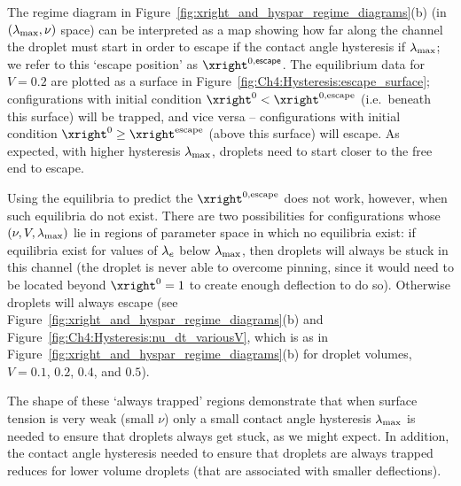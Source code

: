 The regime diagram in Figure~\ref{fig:xright_and_hyspar_regime_diagrams}(b)  (in $(\lambda_{\text{max}}, \nu)$ space) can be interpreted as a map showing how far along the channel the droplet must start in order to escape if the contact angle hysteresis if $\lambda_{\text{max}}$; we refer to this `escape position' as $\xright^{0,\textsf{escape}}$.
The equilibrium data for $V = 0.2$ are plotted as a surface in Figure~\ref{fig:Ch4:Hysteresis:escape_surface}; configurations with initial condition $\xright^0 < \xright^{0,\text{escape}}$ (i.e.~beneath this surface) will be trapped, and vice versa -- configurations with initial condition $\xright^0 \geq \xright^{\text{escape}}$ (above this surface) will escape. As expected, with higher hysteresis $\lambda_{\text{max}}$, droplets need to start closer to the free end to escape.

Using the equilibria to predict the $\xright^{0,\text{escape}}$ does not work, however, when such equilibria do not exist. There are two possibilities for configurations whose $(\nu, V, \lambda_{\text{max}})$ lie in regions of parameter space in which no equilibria exist: if equilibria exist for values of $\lambda_e$ below $\lambda_{\text{max}}$, then droplets will always be stuck in this channel (the droplet is never able to overcome pinning, since it would need to be located beyond $\xright^0 = 1$ to create enough deflection to do so). Otherwise droplets will always escape (see Figure~\ref{fig:xright_and_hyspar_regime_diagrams}(b) and Figure~\ref{fig:Ch4:Hysteresis:nu_dt_variousV}, which is as in Figure~\ref{fig:xright_and_hyspar_regime_diagrams}(b) for droplet volumes, $V = 0.1$, $0.2$, $0.4$, and $0.5$).

The shape of these `always trapped' regions demonstrate that when surface tension is very weak (small $\nu$) only a small contact angle hysteresis $\lambda_{\text{max}}$ is needed to ensure that droplets always get stuck, as we might expect. In addition, the contact angle hysteresis needed to ensure that droplets are always trapped reduces for lower volume droplets (that are associated with smaller deflections).

